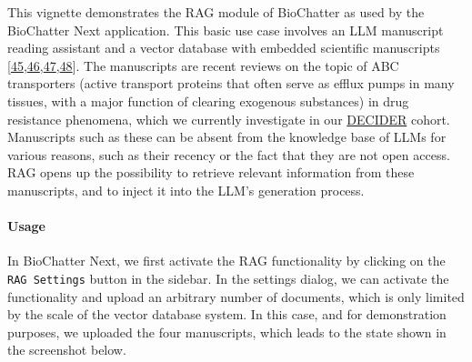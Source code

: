 This vignette demonstrates the RAG module of BioChatter as used by the
BioChatter Next application. This basic use case involves an LLM manuscript
reading assistant and a vector database with embedded scientific manuscripts
{[}\protect\hyperlink{ref-19HQJNP46}{45},\protect\hyperlink{ref-jwL7pDi7}{46},\protect\hyperlink{ref-1FZo9NpKt}{47},\protect\hyperlink{ref-115NnruMc}{48}{]}.
The manuscripts are recent reviews on the topic of ABC transporters (active
transport proteins that often serve as efflux pumps in many tissues, with a
major function of clearing exogenous substances) in drug resistance phenomena,
which we currently investigate in our \href{https://deciderproject.eu}{DECIDER}
cohort. Manuscripts such as these can be absent from the knowledge base of LLMs
for various reasons, such as their recency or the fact that they are not open
access. RAG opens up the possibility to retrieve relevant information from these
manuscripts, and to inject it into the LLM's generation process.

\hypertarget{usage-1}{%
\paragraph{Usage}\label{usage-1}}

In BioChatter Next, we first activate the RAG functionality by clicking on the
\texttt{RAG\ Settings} button in the sidebar. In the settings dialog, we can activate
the functionality and upload an arbitrary number of documents, which is only
limited by the scale of the vector database system. In this case, and for
demonstration purposes, we uploaded the four manuscripts, which leads to the
state shown in the screenshot below.

